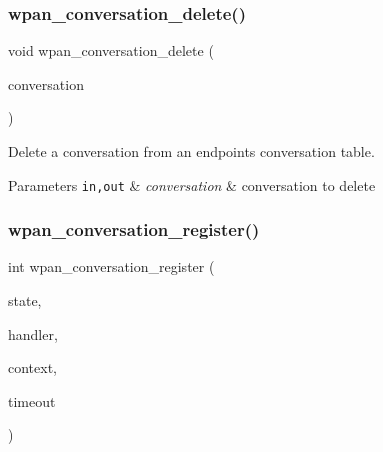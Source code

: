 \mbox{\label{group__wpan__aps_gad36c04a3f2741f52710ab7768d1fcda8}} 
\subsubsection{\texorpdfstring{wpan\+\_\+conversation\+\_\+delete()}{wpan\_conversation\_delete()}}
{\footnotesize\ttfamily void wpan\+\_\+conversation\+\_\+delete (\begin{DoxyParamCaption}\item[{\hyperlink{structwpan__conversation__t}{wpan\+\_\+conversation\+\_\+t} \hyperlink{group__hal_gaef060b3456fdcc093a7210a762d5f2ed}{F\+AR} $\ast$}]{conversation }\end{DoxyParamCaption})}



Delete a conversation from an endpoint\textquotesingle{}s conversation table. 


\begin{DoxyParams}[1]{Parameters}
\mbox{\tt in,out}  & {\em conversation} & conversation to delete \\
\hline
\end{DoxyParams}
\mbox{\label{group__wpan__aps_gae5f88ed40bd334d963e261947b77b980}} 
\subsubsection{\texorpdfstring{wpan\+\_\+conversation\+\_\+register()}{wpan\_conversation\_register()}}
{\footnotesize\ttfamily int wpan\+\_\+conversation\+\_\+register (\begin{DoxyParamCaption}\item[{\hyperlink{structwpan__ep__state__t}{wpan\+\_\+ep\+\_\+state\+\_\+t} \hyperlink{group__hal_gaef060b3456fdcc093a7210a762d5f2ed}{F\+AR} $\ast$}]{state,  }\item[{\hyperlink{group__wpan__aps_gabf0a6b85c9ff3ff9104c8b58c1436d72}{wpan\+\_\+response\+\_\+fn}}]{handler,  }\item[{const void \hyperlink{group__hal_gaef060b3456fdcc093a7210a762d5f2ed}{F\+AR} $\ast$}]{context,  }\item[{\hyperlink{group__hal__dos_ga5a8b2dc9e45a9ee81a94ef304fb62505}{uint16\+\_\+t}}]{timeout }\end{DoxyParamCaption})}



